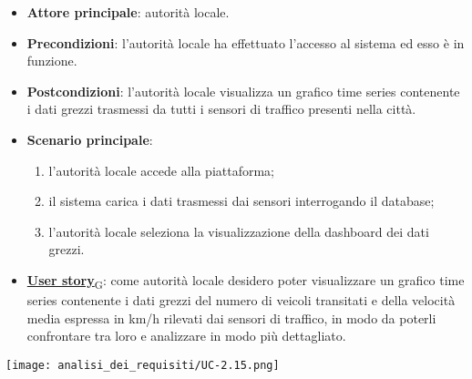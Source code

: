 \begin{itemize}
	\item \textbf{Attore principale}: autorità locale.
	\item \textbf{Precondizioni}: l'autorità locale ha effettuato l'accesso al sistema ed esso è in funzione.
	\item \textbf{Postcondizioni}: l'autorità locale visualizza un grafico time series contenente i dati grezzi trasmessi da tutti i sensori
	      di traffico presenti nella città.
	\item \textbf{Scenario principale}:
	      \begin{enumerate}
		      \item l'autorità locale accede alla piattaforma;
		      \item il sistema carica i dati trasmessi dai sensori interrogando il database;
		      \item l'autorità locale seleziona la visualizzazione della dashboard dei dati grezzi.
	      \end{enumerate}
	\item \href{https://7last.github.io/docs/pb/documentazione-interna/glossario\#user-story}{\textbf{User story}\textsubscript{G}}:
	      come autorità locale desidero poter visualizzare un grafico time series contenente i dati grezzi del numero di veicoli transitati e della velocità media espressa in km/h
	      rilevati dai sensori di traffico, in modo da poterli confrontare tra loro e analizzare in modo più dettagliato.
\end{itemize}
\begin{center}
	\texttt{[image: analisi\_dei\_requisiti/UC-2.15.png]}
\end{center}


